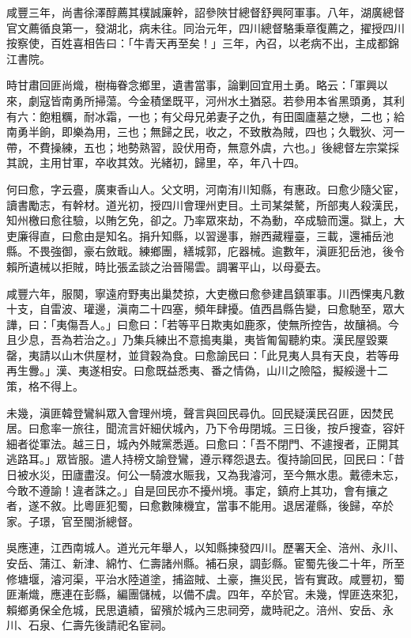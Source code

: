 \begin{pinyinscope}
咸豐三年，尚書徐澤醇薦其樸誠廉幹，詔參陜甘總督舒興阿軍事。八年，湖廣總督官文薦循良第一，發湖北，病未往。同治元年，四川總督駱秉章復薦之，擢授四川按察使，百姓喜相告曰：「牛青天再至矣！」三年，內召，以老病不出，主成都錦江書院。

時甘肅回匪尚熾，樹梅眷念鄉里，遺書當事，論剿回宜用土勇。略云：「軍興以來，劇寇皆南勇所掃蕩。今金積堡既平，河州水土猶惡。若參用本省黑頭勇，其利有六：飽粗糲，耐冰霜，一也；有父母兄弟妻子之仇，有田園廬墓之戀，二也；給南勇半餉，即樂為用，三也；無歸之民，收之，不致散為賊，四也；久戰狄、河一帶，不費操練，五也；地勢熟習，設伏用奇，無意外虞，六也。」後總督左宗棠採其說，主用甘軍，卒收其效。光緒初，歸里，卒，年八十四。

何曰愈，字云亹，廣東香山人。父文明，河南洧川知縣，有惠政。曰愈少隨父宦，讀書勵志，有幹材。道光初，授四川會理州吏目。土司某桀驁，所部夷人殺漢民，知州檄曰愈往驗，以賄乞免，卻之。乃率眾來劫，不為動，卒成驗而還。獄上，大吏廉得直，曰愈由是知名。捐升知縣，以習邊事，辦西藏糧臺，三載，還補岳池縣。不畏強御，豪右斂戢。練鄉團，繕城郭，庀器械。逾數年，滇匪犯岳池，後令賴所遺械以拒賊，時比張孟談之治晉陽雲。調署平山，以母憂去。

咸豐六年，服闋，寧遠府野夷出巢焚掠，大吏檄曰愈參建昌鎮軍事。川西惈夷凡數十支，自雷波、瓘邊，滇南二十四塞，頻年肆擾。值西昌縣告變，曰愈馳至，眾大譁，曰：「夷傷吾人。」曰愈曰：「若等平日欺夷如鹿豕，使無所控告，故釀禍。今且少息，吾為若治之。」乃集兵練出不意搗夷巢，夷皆匍匐聽約束。漢民屋毀粟罄，夷請以山木供屋材，並貸穀為食。曰愈諭民曰：「此見夷人具有天良，若等毋再生釁。」漢、夷遂相安。曰愈既益悉夷、番之情偽，山川之險隘，擬綏邊十二策，格不得上。

未幾，滇匪韓登鸞糾眾入會理州境，聲言與回民尋仇。回民疑漢民召匪，因焚民居。曰愈率一旅往，聞流言奸細伏城內，乃下令毋閉城。三日後，按戶搜查，容奸細者從軍法。越三日，城內外賊黨悉遁。曰愈曰：「吾不閉門、不遽搜者，正開其逃路耳。」眾皆服。遣人持榜文諭登鸞，遵示釋怨退去。復持諭回民，回民曰：「昔日被水災，田廬盡沒。何公一騎渡水賑我，又為我濬河，至今無水患。戴德未忘，今敢不遵諭！違者誅之。」自是回民亦不擾州境。事定，鎮府上其功，會有攘之者，遂不敘。比粵匪犯蜀，曰愈數陳機宜，當事不能用。退居灌縣，後歸，卒於家。子璟，官至閩浙總督。

吳應連，江西南城人。道光元年舉人，以知縣揀發四川。歷署天全、涪州、永川、安岳、蒲江、新津、綿竹、仁壽諸州縣。補石泉，調彭縣。宦蜀先後二十年，所至修塘堰，濬河渠，平治水陸道塗，捕盜賊、土豪，撫災民，皆有實政。咸豐初，蜀匪漸熾，應連在彭縣，編團儲械，以備不虞。四年，卒於官。未幾，悍匪迭來犯，賴鄉勇保全危城，民思遺績，留殯於城內三忠祠旁，歲時祀之。涪州、安岳、永川、石泉、仁壽先後請祀名宦祠。


\end{pinyinscope}
